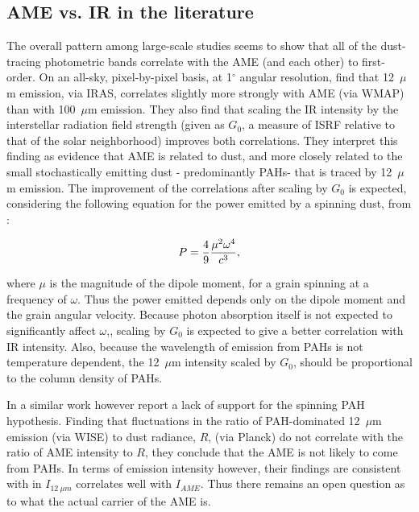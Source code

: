        \subsection{AME vs. IR in the literature}
          The overall pattern among large-scale studies seems to show that all of the dust-tracing photometric bands correlate with the AME (and each other) to first-order.  On an all-sky, pixel-by-pixel basis, at 1$^{\circ}$ angular resolution, \cite{ysard10b} find that 12~$\mu$m emission, via IRAS, correlates slightly more strongly with AME (via WMAP) than with 100~$\mu$m emission.  They also find that scaling the IR intensity by the interstellar radiation field strength (given as $G_{0}$, a measure of ISRF relative to that of the solar neighborhood) improves both correlations. They interpret this finding as evidence that AME is related to dust, and more closely related to the small stochastically emitting dust - predominantly PAHs- that is traced by 12~$\mu$m emission.
          The improvement of the correlations after scaling by $G_{0}$ is expected, considering the following equation for the power emitted by a spinning dust, from \cite{draine98b}:
        \begin{center}
        \begin{equation}
        P = {4\over9} {\mu^2\omega^4\over c^3},
        \label{eq:Pspin}
        \end{equation}
        \end{center}
        where $\mu$ is the magnitude of the dipole moment, for a grain spinning at a frequency of $\omega$. Thus the power emitted depends only on the dipole moment and the grain angular velocity. Because photon absorption itself is not expected to significantly affect $\omega$,\citep{draine98b, ali-haimoud09}, scaling by $G_{0}$ is expected to give a better correlation with IR intensity. Also, because the wavelength of emission from PAHs is not temperature dependent, the 12~$\mu$m intensity scaled by $G_{0}$, should be proportional to the column density of PAHs.

          In a similar work however \cite{hensley16} report a lack of support for the spinning PAH hypothesis. Finding that fluctuations in the ratio of PAH-dominated 12~$\mu$m emission (via WISE) to dust radiance, $R$, (via Planck) do not correlate with the ratio of AME intensity to $R$, they conclude that the AME is not likely to come from PAHs. In terms of emission intensity however, their findings are consistent with \cite{ysard10b} in $I_{12~\mu{}m}$ correlates well with $I_{AME}$. Thus there remains an open question as to what the actual carrier of the AME is.

